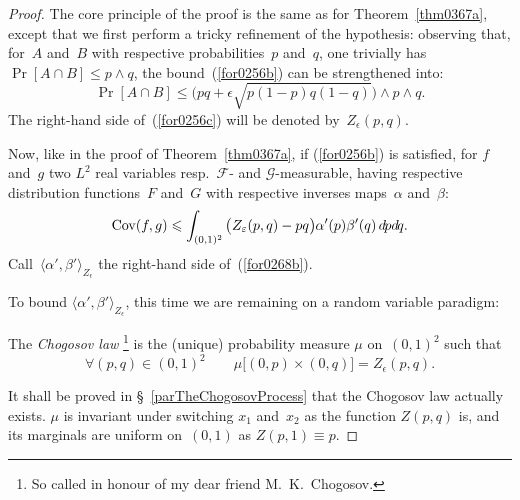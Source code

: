 \begin{proof}
The core principle of the proof is the same as for Theorem~\ref{thm0367a},
except that we first perform a tricky refinement of the hypothesis:
observing that, for~$A$ and~$B$ with respective probabilities~$p$ and~$q$,
one trivially has $\Pr[A\cap B] \leq p\wedge q$,
the bound~(\ref{for0256b}) can be strengthened into:
\[\label{for0256c} \Pr[A\cap B] \leq \big( pq + \epsilon\sqrt{p(1-p)q(1-q)} \big) \wedge p\wedge q .\]
The right-hand side of~(\ref{for0256c}) will be denoted by~$Z_{\epsilon}(p,q)$.

Now, like in the proof of Theorem~\ref{thm0367a},
if (\ref{for0256b}) is satisfied, for $f$ and~$g$ two $L^2$ real variables
resp.\ $\mathcal{F}$- and $\mathcal{G}$-measurable, having respective distribution functions~$F$ and~$G$
with respective inverses maps~$\alpha$ and~$\beta$:
\[\label{for0268b} \Cov(f,g) \leq \int_{(0,1)^2} \big(Z_{\epsilon}(p,q)-pq\big) \alpha'(p)\beta'(q)
\, \dx{p}\dx{q} .\]
Call~$\langle\alpha',\beta'\rangle_{Z_\epsilon}$ the right-hand side of~(\ref{for0268b}).

To bound $\langle\alpha',\beta'\rangle_{Z_\epsilon}$,
this time we are remaining on a random variable paradigm:
%
\begin{Def}\label{def5228}
The \emph{Chogosov law}%
\footnote{So called in honour of my dear friend M.~K.~Chogosov.}
is the (unique) probability measure $\mu$ on~$(0,1)^2$ such that
\[\label{for0229}
\forall (p,q) \in (0,1)^2 \qquad \mu\big[ (0,p) \times (0,q) \big] = Z_\epsilon(p,q) .\]
\end{Def}
%
It shall be proved in \S~\ref{parTheChogosovProcess} that the Chogosov law actually exists.
$\mu$ is invariant under switching $x_1$ and~$x_2$ as the function $Z(p,q)$ is,
and its marginals are uniform on~$(0,1)$ as $Z(p,1) \equiv p$.


\end{proof}
